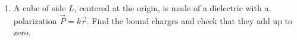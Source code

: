 \documentclass[fleqn]{article}
\begin{document}
\begin{enumerate}
{        $
          \begin{cases}
            m_{proton}=1.6726219 × 10^{-27} ~ kg
            \\
            \\
            q_{proton}=1.602176634×10^{−19} ~ C
            \\
            \\
            B=10^{-9} ~ T
          \end{cases}
          \\
          \\
          \\
          T=\dfrac{2 \pi m}{q B}=\dfrac{\left(2 \pi\right) ~ \left(1.6726219 × 10^{-27} ~ kg\right)}{\left(1.602176634×10^{−19} ~ C\right) ~ \left(10^{-9} ~ T\right)}
          \\
          \\
          \\
          \therefore ~~~ T=65.5944 ~ s
        $
        \\ 
      }

    \item A cube of side $L$, centered at the origin, is made of a dielectric with a polarization $\overrightarrow{P}=k \overrightarrow{r}$.
    Find the bound charges and check that they add up to zero.


\end{enumerate}
\end{document}
